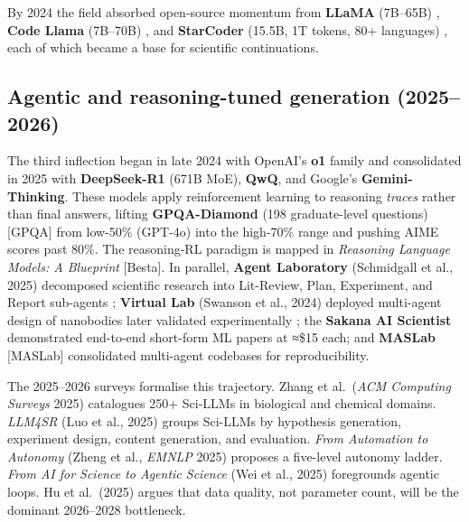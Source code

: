 \documentclass{article}
\begin{document}
By 2024 the field absorbed open-source momentum from \textbf{LLaMA} (7B--65B) \cite{touvron2023llamaopenandeffici}, \textbf{Code Llama} (7B--70B) \cite{rozire2023codellamaopenfound}, and \textbf{StarCoder} (15.5B, 1T tokens, 80+ languages) \cite{li2023starcodermaythesou}, each of which became a base for scientific continuations.

\subsection{Agentic and reasoning-tuned generation (2025--2026)}\label{agentic-and-reasoning-tuned-generation-20252026}

The third inflection began in late 2024 with OpenAI's \textbf{o1} family and consolidated in 2025 with \textbf{DeepSeek-R1} (671B MoE), \textbf{QwQ}, and Google's \textbf{Gemini-Thinking}. These models apply reinforcement learning to reasoning \emph{traces} rather than final answers, lifting \textbf{GPQA-Diamond} (198 graduate-level questions) {[}GPQA{]} from low-50\% (GPT-4o) into the high-70\% range and pushing AIME scores past 80\%. The reasoning-RL paradigm is mapped in \emph{Reasoning Language Models: A Blueprint} {[}Besta{]}. In parallel, \textbf{Agent Laboratory} (Schmidgall et al., 2025) decomposed scientific research into Lit-Review, Plan, Experiment, and Report sub-agents \cite{schmidgall2025agentlaboratoryusi}; \textbf{Virtual Lab} (Swanson et al., 2024) deployed multi-agent design of nanobodies later validated experimentally \cite{swanson2024thevirtuallabaiage}; the \textbf{Sakana AI Scientist} demonstrated end-to-end short-form ML papers at ≈\$15 each; and \textbf{MASLab} {[}MASLab{]} consolidated multi-agent codebases for reproducibility.

The 2025--2026 surveys formalise this trajectory. Zhang et al.~(\emph{ACM Computing Surveys} 2025) \cite{zhang2025scientificlargelan} catalogues 250+ Sci-LLMs in biological and chemical domains. \emph{LLM4SR} (Luo et al., 2025) \cite{luo2025llm4srasurveyonlar} groups Sci-LLMs by hypothesis generation, experiment design, content generation, and evaluation. \emph{From Automation to Autonomy} (Zheng et al., \emph{EMNLP} 2025) \cite{zheng2025fromautomationtoau} proposes a five-level autonomy ladder. \emph{From AI for Science to Agentic Science} (Wei et al., 2025) \cite{wei2025fromaiforscienceto} foregrounds agentic loops. Hu et al.~(2025) \cite{hu2025asurveyofscientifi} argues that data quality, not parameter count, will be the dominant 2026--2028 bottleneck.
\end{document}
